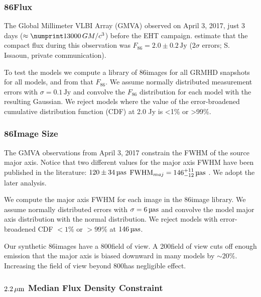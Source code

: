 \subsubsection{86\GHz Flux}

The Global Millimeter VLBI Array (GMVA) observed \sgra on April 3, 2017, just 3 days ($\approx \no{13000}\,\tg$) before the EHT campaign.
\citet{2019ApJ...871...30I} estimate that the compact flux during this observation was $F_{86} = 2.0 \pm 0.2\,\mathrm{Jy}$ ($2\sigma$ errors; S. Issaoun, private communication).

To test the models we compute a library of 86\GHz images for all GRMHD snapshots for all models, and from that $F_{86}$.
We assume normally distributed measurement errors with $\sigma = 0.1\,\mathrm{Jy}$ and convolve the $F_{86}$ distribution for each model with the resulting Gaussian.
We reject models where the value of the error-broadened cumulative distribution function (CDF) at 2.0 Jy is <1\% or >99\%.

\subsubsection{86\GHz Image Size}\label{sec:86size}

The GMVA observations from April 3, 2017 constrain the FWHM of the source major axis.
Notice that two different values for the major axis FWHM have been published in the literature: $120 \pm 34\uas$ \citep{2019ApJ...871...30I}
${\rm FWHM}_{maj} = 146^{+11}_{-12}\uas$ \citep[95\% confidence][]{2021ApJ...915...99I}.
We adopt the later analysis.

We compute the major axis FWHM for each image in the 86\GHz image library.
We assume normally distributed errors with $\sigma = 6\uas$ and convolve the model major axis distribution with the normal distribution.
We reject models with error-broadened CDF $< 1\%$ or $> 99\%$ at $146\uas$.

Our synthetic 86\GHz images have a 800\uas field of view.
A 200\uas field of view cuts off enough emission that the major axis is biased downward in many models by $\sim 20\%$.
Increasing the field of view beyond 800\uas has negligible effect.

\subsubsection{$2.2\,\mu\mathrm{m}$ Median Flux Density Constraint}\label{subsec:nir}

